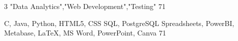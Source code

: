 {\begin{minipage}{0.4\textwidth}
\begin{tcolorbox}[
            height=0.99\textheight, 
            grow to left by=0.3cm, 
            colback=graybox,
            colframe=graybox,
            arc=0mm
        ]

           \areaOfInterest
                {3}
                {{"Data Analytics"},{"Web Development"},{"Testing"}}
                {71}
           \vspace*{-0.3cm}
           \par\noindent\dotfill
           \vspace*{-0.2cm}

           \vspace*{-0.1cm}
           \skills
                {C, Java, Python, HTML5, CSS}
                {SQL, PostgreSQL}
                {Spreadsheets, PowerBI, Metabase, LaTeX, MS Word, PowerPoint, Canva}
                {71}

           \vspace*{-0.5cm}
           \vspace*{0.2cm}

        \end{tcolorbox}
    \end{minipage}}
